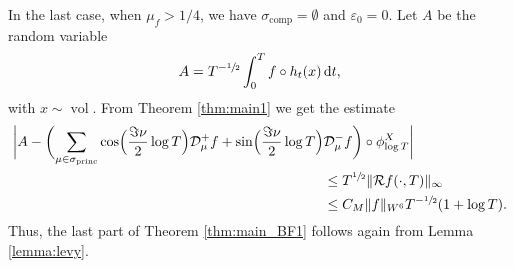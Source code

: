 \documentclass[10pt]{amsart}
\newcommand*{\diff}{\mathop{}\!\mathrm{d}}
\newcommand{\Dp}[1]{\mathcal{D}_\mu^{+} #1}
\newcommand{\Dm}[1]{\mathcal{D}_\mu^{-} #1}
\DeclareMathOperator{\vol}{vol}
\DeclareMathOperator{\comp}{comp}
\DeclareMathOperator{\princ}{princ}
\theoremstyle{definition}
\begin{document}
In the last case, when $\mu_f > 1/4$, we have $\sigma_{\comp} = \emptyset$ and $\varepsilon_0=0$.
Let $A$ be the random variable
\[
A = T^{-\sfrac{1}{2}} \int_0^T f \circ h_t(x) \diff t,
\]
with $x \sim \vol$.
From Theorem \ref{thm:main1} we get the estimate
\begin{align*}
\biggl\lvert A - \biggl(\sum_{\mu \in \sigma_{\princ}} \cos\Bigl(\frac{\Im\nu}{2} \log T \Bigr) \Dp{ f} + \sin\Bigl(\frac{\Im\nu}{2} \log T \Bigr) &\Dm{ f} \biggr)\circ \phi^X_{\log T} \biggr\rvert\\
&\leq T^{\sfrac{1}{2}} \|\mathcal{R}f(\cdot, T) \|_{\infty} \\
& \leq C_M \|f\|_{W^6} T^{-\sfrac{1}{2}} (1+\log T).
\end{align*}
Thus, the last part of Theorem \ref{thm:main_BF1} follows again from Lemma \ref{lemma:levy}.
\end{document}

